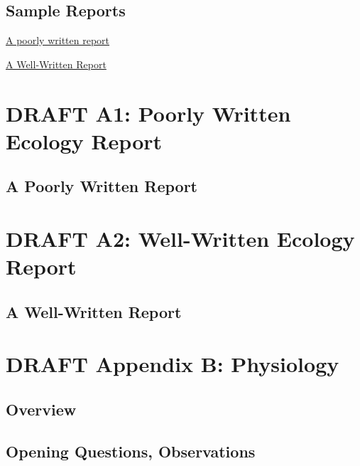 \documentclass[
]{book}
\begin{document}
\hypertarget{sample-reports}{%
\section{Sample Reports}\label{sample-reports}}

\protect\hyperlink{appa813}{A poorly written report}

\protect\hyperlink{appa815}{A Well-Written Report}

\hypertarget{draft-a1-poorly-written-ecology-report}{%
\chapter*{DRAFT A1: Poorly Written Ecology Report}\label{draft-a1-poorly-written-ecology-report}}

\hypertarget{appa813}{%
\section{A Poorly Written Report}\label{appa813}}

\hypertarget{draft-a2-well-written-ecology-report}{%
\chapter*{DRAFT A2: Well-Written Ecology Report}\label{draft-a2-well-written-ecology-report}}

\hypertarget{appa815}{%
\section{A Well-Written Report}\label{appa815}}

\hypertarget{draft-appendix-b-physiology}{%
\chapter*{DRAFT Appendix B: Physiology}\label{draft-appendix-b-physiology}}

\hypertarget{appb820}{%
\section{Overview}\label{appb820}}

\hypertarget{opening-questions-observations-1}{%
\section{Opening Questions, Observations}\label{opening-questions-observations-1}}
\end{document}
